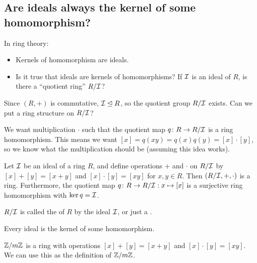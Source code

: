 \documentclass[12pt,letterpaper]{report}
\begin{document}
\pagebreak
\subsection{Are ideals always the kernel of some homomorphism?}

In ring theory:
\begin{itemize}
  \item Kernels of homomorphism are ideals.
  \item Is it true that ideals are kernels of homomorphisms?
    If $\mathcal{I}$ is an ideal of $R$, is there a ``quotient ring'' $R/\mathcal{I}$?
\end{itemize}

Since $(R, +)$ is commutative, $\mathcal{I} \trianglelefteq R$, so the quotient group $R/\mathcal{I}$ exists.
Can we put a ring structure on $R/\mathcal{I}$?

We want multiplication $\cdot$ such that the quotient map $q \colon R \to R/\mathcal{I}$ is a ring
homomorphism.
This means we want $[x] = q(xy) = q(x)q(y) = [x] \cdot [y]$, so we know what the multiplication
should be (assuming this idea works).

\begin{thm}{}{}
  Let $\mathcal{I}$ be an ideal of a ring $R$, and define operations $+$ and $\cdot$ on $R/\mathcal{I}$ by
  $[x] + [y] = [x + y]$ and $[x] \cdot [y] = [xy]$ for $x, y \in R$.
  Then $(R/\mathcal{I}, +, \cdot)$ is a ring.
  Furthermore, the quotient map $q \colon R \to R/\mathcal{I} : x \mapsto [x]$ is a surjective ring
  homomorphism with $\ker q = \mathcal{I}$.
\end{thm}

$R/\mathcal{I}$ is called the  of $R$ by the ideal $\mathcal{I}$, or just a
.

\begin{cor}{}{}
  Every ideal is the kernel of some homomorphism.
\end{cor}

\begin{ex}
  $\mathbb{Z}/{m}\mathbb{Z}$ is a ring with operations $[x] + [y] = [x + y]$ and $[x] \cdot [y] = [xy]$.
  We can use this as the definition of $\mathbb{Z}/{m}\mathbb{Z}$.
\end{ex}
\end{document}
